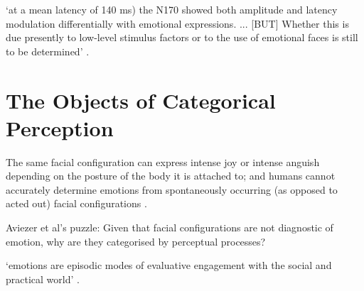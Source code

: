 \documentclass[12pt]{extarticle}
\begin{document}
\begin{multicols*}{3}
‘at a mean latency of 140 ms) the N170 showed both amplitude and latency
modulation differentially with emotional expressions. ...
[BUT] Whether this is due presently to low-level stimulus factors or to the use of emotional faces
is still to be determined’ \citep[p.~616]{batty:2003_early}.



\section{The Objects of Categorical Perception}

The same facial configuration can express intense joy or intense anguish depending on the posture of
the body it is attached to; and humans cannot accurately determine emotions from
spontaneously occurring (as opposed to acted out) facial
configurations \citep{motley:1988_facial,aviezer:2008_angry,aviezer:2012_body}.

Aviezer et al's puzzle:
Given that  facial configurations are not diagnostic of emotion, why  are they categorised by perceptual processes?

‘emotions are episodic modes of evaluative engagement with the social and practical world’
\citep[p.\ 1512]{parkinson:2008_emotions}.


 



\footnotesize


\end{multicols*}
\end{document}
